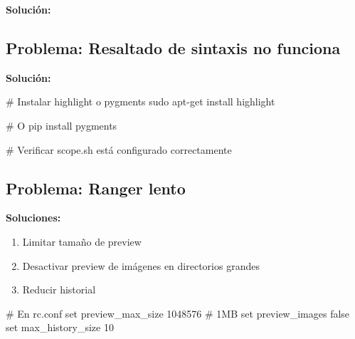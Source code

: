 \documentclass[
  doc,
  floatsintext,
  longtable,
  a4paper,
  nolmodern,
  notxfonts,
  notimes,
  12pt,
  colorlinks=true,linkcolor=blue,citecolor=blue,urlcolor=blue]{apa7}
\newenvironment{Shaded}{\begin{snugshade}}{\end{snugshade}}
\newcommand{\BuiltInTok}[1]{\textcolor[rgb]{0.00,0.23,0.31}{#1}}
\newcommand{\CommentTok}[1]{\textcolor[rgb]{0.37,0.37,0.37}{#1}}
\newcommand{\ExtensionTok}[1]{\textcolor[rgb]{0.00,0.23,0.31}{#1}}
\newcommand{\FunctionTok}[1]{\textcolor[rgb]{0.28,0.35,0.67}{#1}}
\newcommand{\NormalTok}[1]{\textcolor[rgb]{0.00,0.23,0.31}{#1}}
\newcommand{\OperatorTok}[1]{\textcolor[rgb]{0.37,0.37,0.37}{#1}}
\newcommand{\VariableTok}[1]{\textcolor[rgb]{0.07,0.07,0.07}{#1}}
\providecommand{\tightlist}{%
  \setlength{\itemsep}{0pt}\setlength{\parskip}{0pt}}
\begin{document}
\textbf{Solución:}

\begin{Shaded}
\end{Shaded}

\subsection{Problema: Resaltado de sintaxis no
funciona}\label{problema-resaltado-de-sintaxis-no-funciona}

\textbf{Solución:}

\begin{Shaded}
\begin{Highlighting}[]
\CommentTok{\# Instalar highlight o pygments}
\FunctionTok{sudo}\NormalTok{ apt{-}get install highlight}

\CommentTok{\# O}
\ExtensionTok{pip}\NormalTok{ install pygments}

\CommentTok{\# Verificar scope.sh está configurado correctamente}
\end{Highlighting}
\end{Shaded}

\subsection{Problema: Ranger lento}\label{problema-ranger-lento}

\textbf{Soluciones:}

\begin{enumerate}
\def\labelenumi{\arabic{enumi}.}
\tightlist
\item
  Limitar tamaño de preview
\item
  Desactivar preview de imágenes en directorios grandes
\item
  Reducir historial
\end{enumerate}

\begin{Shaded}
\begin{Highlighting}[]
\CommentTok{\# En rc.conf}
\BuiltInTok{set}\NormalTok{ preview\_max\_size 1048576  }\CommentTok{\# 1MB}
\BuiltInTok{set}\NormalTok{ preview\_images false}
\BuiltInTok{set}\NormalTok{ max\_history\_size 10}
\end{Highlighting}
\end{Shaded}
\end{document}

